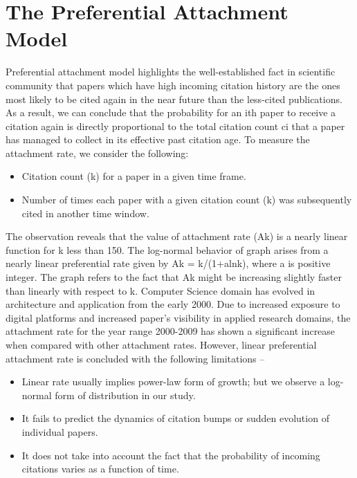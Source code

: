 \section{The Preferential Attachment Model}

Preferential attachment model highlights the well-established fact in scientific community that papers which have high incoming citation history are the ones most likely to be cited again in the near future than the less-cited publications. As a result, we can conclude that the probability for an ith paper to receive a citation again is directly proportional to the total citation count ci that a paper has managed to collect in its effective past citation age. To measure the attachment rate, we consider the following:
\begin{itemize}
    \item Citation count (k) for a paper in a given time frame.
    \item  Number of times each paper with a given citation count (k) was subsequently cited in another time window.
\end{itemize}

The observation reveals that the value of attachment rate (Ak) is a nearly linear function for k less than 150. The log-normal behavior of graph arises from a nearly linear preferential rate given by Ak = k/(1+alnk), where a is positive integer. The graph refers to the fact that Ak might be increasing slightly faster than linearly with respect to k. Computer Science domain has evolved in architecture and application from the early 2000. Due to increased exposure to digital platforms and increased paper’s visibility in applied research domains, the attachment rate for the year range 2000-2009 has shown a significant increase when compared with other attachment rates. However, linear preferential attachment rate is concluded with the following limitations – 
\begin{itemize}
    \item Linear rate usually implies power-law form of growth; but we observe a log-normal form of distribution in our study.
    \item It fails to predict the dynamics of citation bumps or sudden evolution of individual papers.
    \item It does not take into account the fact that the probability of incoming citations varies as a function of time.
\end{itemize}

